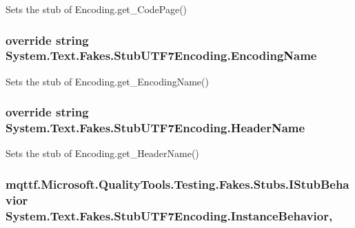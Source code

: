 Sets the stub of Encoding.\-get\-\_\-\-Code\-Page()

\hypertarget{class_system_1_1_text_1_1_fakes_1_1_stub_u_t_f7_encoding_a491faca59b95bc3cf4c327cfcfdadf23}{
\subsubsection[{Encoding\-Name}]{\setlength{\rightskip}{0pt plus 5cm}override string System.\-Text.\-Fakes.\-Stub\-U\-T\-F7\-Encoding.\-Encoding\-Name\hspace{0.3cm}{\ttfamily [get]}}}\label{class_system_1_1_text_1_1_fakes_1_1_stub_u_t_f7_encoding_a491faca59b95bc3cf4c327cfcfdadf23}


Sets the stub of Encoding.\-get\-\_\-\-Encoding\-Name()

\hypertarget{class_system_1_1_text_1_1_fakes_1_1_stub_u_t_f7_encoding_abd8815ae870a9df7e598eeb41286cfdd}{
\subsubsection[{Header\-Name}]{\setlength{\rightskip}{0pt plus 5cm}override string System.\-Text.\-Fakes.\-Stub\-U\-T\-F7\-Encoding.\-Header\-Name\hspace{0.3cm}{\ttfamily [get]}}}\label{class_system_1_1_text_1_1_fakes_1_1_stub_u_t_f7_encoding_abd8815ae870a9df7e598eeb41286cfdd}


Sets the stub of Encoding.\-get\-\_\-\-Header\-Name()

\hypertarget{class_system_1_1_text_1_1_fakes_1_1_stub_u_t_f7_encoding_a951ecd8d699bd98523543a4723a27d49}{
\subsubsection[{Instance\-Behavior}]{\setlength{\rightskip}{0pt plus 5cm}mqttf.\-Microsoft.\-Quality\-Tools.\-Testing.\-Fakes.\-Stubs.\-I\-Stub\-Behavior System.\-Text.\-Fakes.\-Stub\-U\-T\-F7\-Encoding.\-Instance\-Behavior\hspace{0.3cm}{\ttfamily [get]}, {\ttfamily [set]}}}\label{class_system_1_1_text_1_1_fakes_1_1_stub_u_t_f7_encoding_a951ecd8d699bd98523543a4723a27d49}


